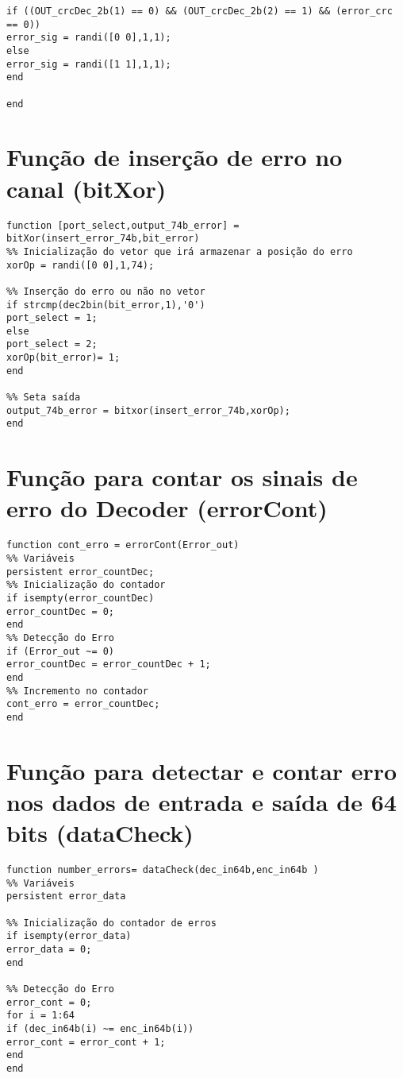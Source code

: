 \begin{apendicesenv}
\begin{lstlisting}
if ((OUT_crcDec_2b(1) == 0) && (OUT_crcDec_2b(2) == 1) && (error_crc == 0))
error_sig = randi([0 0],1,1);
else
error_sig = randi([1 1],1,1);
end

end
\end{lstlisting}

\chapter{Função de inserção de erro no canal (bitXor)}
\begin{lstlisting}
function [port_select,output_74b_error] = bitXor(insert_error_74b,bit_error)
%% Inicialização do vetor que irá armazenar a posição do erro
xorOp = randi([0 0],1,74);

%% Inserção do erro ou não no vetor
if strcmp(dec2bin(bit_error,1),'0')
port_select = 1;
else
port_select = 2;
xorOp(bit_error)= 1;
end

%% Seta saída 
output_74b_error = bitxor(insert_error_74b,xorOp);
end
\end{lstlisting}


\chapter{Função para contar os sinais de erro do Decoder (errorCont)}

\begin{lstlisting}
function cont_erro = errorCont(Error_out)
%% Variáveis
persistent error_countDec;
%% Inicialização do contador
if isempty(error_countDec)
error_countDec = 0;
end
%% Detecção do Erro
if (Error_out ~= 0)
error_countDec = error_countDec + 1;
end
%% Incremento no contador
cont_erro = error_countDec;
end
\end{lstlisting}


\chapter{Função para detectar e contar erro nos dados de entrada e saída de 64 bits (dataCheck)}
\begin{lstlisting}
function number_errors= dataCheck(dec_in64b,enc_in64b )
%% Variáveis
persistent error_data

%% Inicialização do contador de erros
if isempty(error_data)
error_data = 0;
end

%% Detecção do Erro
error_cont = 0;
for i = 1:64
if (dec_in64b(i) ~= enc_in64b(i))
error_cont = error_cont + 1;
end
end


\end{lstlisting}
\end{apendicesenv}
